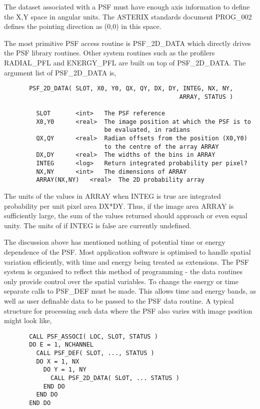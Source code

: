      The dataset associated with a PSF must have enough axis information
     to define the X,Y space in angular units. The ASTERIX standards 
     document PROG\_002 defines the pointing direction as (0,0) in this
     space.

     The most primitive PSF access routine is PSF\_2D\_DATA which directly
     drives the PSF library routines. Other system routines such as the
     profilers RADIAL\_PFL and ENERGY\_PFL are built on top of PSF\_2D\_DATA.
     The argument list of PSF\_2D\_DATA is,

\begin{verbatim}
       PSF_2D_DATA( SLOT, X0, Y0, QX, QY, DX, DY, INTEG, NX, NY,
                                                 ARRAY, STATUS )

         SLOT		<int>   The PSF reference
         X0,Y0		<real>  The image position at which the PSF is to
                        	be evaluated, in radians
         QX,QY		<real>  Radian offsets from the position (X0,Y0)
                        	to the centre of the array ARRAY
         DX,DY		<real>  The widths of the bins in ARRAY
         INTEG		<log>   Return integrated probability per pixel?
         NX,NY  	<int>   The dimensions of ARRAY
         ARRAY(NX,NY)	<real>  The 2D probability array
\end{verbatim}

     The units of the values in ARRAY when INTEG is true are integrated 
     probability per unit pixel area DX*DY. Thus, if the image area ARRAY
     is sufficiently large, the sum of the values returned should approach
     or even equal unity. The units of if INTEG is false are currently
     undefined.

     The discussion above has mentioned nothing of potential time or
     energy dependence of the PSF. Most application software is optimised
     to handle spatial variation efficiently, with time and energy being
     treated as extensions. The PSF system is organised to reflect this
     method of programming - the data routines only provide control over
     the spatial variables. To change the energy or time separate calls
     to PSF\_DEF must be made. This allows time and energy bands, as well
     as user definable data to be passed to the PSF data routine. A 
     typical structure for processing such data where the PSF also varies
     with image position might look like,

\begin{verbatim}
       CALL PSF_ASSOCI( LOC, SLOT, STATUS )
       DO E = 1, NCHANNEL
         CALL PSF_DEF( SLOT, ..., STATUS )
         DO X = 1, NX
           DO Y = 1, NY
             CALL PSF_2D_DATA( SLOT, ... STATUS )
           END DO
         END DO 
       END DO
\end{verbatim}

